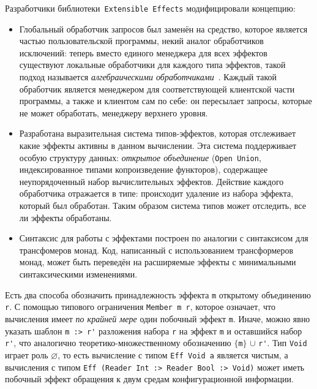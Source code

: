     Разработчики библиотеки~\lstinline{Extensible Effects} модифицировали концепцию:

    \begin{itemize}
      \item
    Глобальный обработчик запросов был заменён на средство, которое является частью
    пользовательской программы, некий аналог обработчиков исключений: теперь вместо
    единого менеджера для всех эффектов существуют локальные обработчики для каждого
    типа эффектов, такой подход называется \emph{алгебраическими
    обработчиками}~\cite{effAndHandl}. Каждый такой обработчик является менеджером
    для соответствующей клиентской части программы, а также и клиентом сам по себе:
    он пересылает запросы, которые не может обработать, менеджеру верхнего уровня.
      \item
    Разработана выразительная система типов-эффектов, которая отслеживает какие
    эффекты активны в данном вычислении. Эта система поддерживает особую структуру
    данных: \emph{открытое объединение} (\lstinline{Open Union}, индексированное
    типами копроизведение функторов), содержащее неупорядоченный набор
    вычислительных эффектов. Действие каждого обработчика отражается в типе:
    происходит удаление из набора эффекта, который был обработан. Таким
    образом система типов может отследить, все ли эффекты обработаны.
      \item
    Синтаксис для работы с эффектами построен по аналогии с синтаксисом для
    трансфомеров монад. Код, написанный с использованием трансформеров монад,
    может быть переведён на расширяемые эффекты с минимальными синтаксическими
    изменениями.
    \end{itemize}

    Есть два способа обозначить принадлежность эффекта \lstinline{m} открытому
    объединению \lstinline{r}. С помощью типового ограничения
    \mbox{\lstinline{Member m r},} которое означает, что вычисления имеет
    \emph{по крайней мере} один побочный эффект \lstinline{m}. Иначе, можно явно
    указать шаблон \lstinline{m :> r'} разложения набора \lstinline{r} на
    эффект \lstinline{m} и оставшийся набор \lstinline{r'}, что аналогично
    теоретико-множественному обозначению $\{$\lstinline{m}$\}$ $\cup$
    \lstinline{r'}. Тип \lstinline{Void} играет роль $\varnothing$, то есть
    вычисление с типом \lstinline{Eff Void a} является чистым, а вычисления с
    типом \lstinline{Eff (Reader Int :> Reader Bool :> Void)} может иметь побочный
    эффект обращения к двум средам конфигурационной информации.

